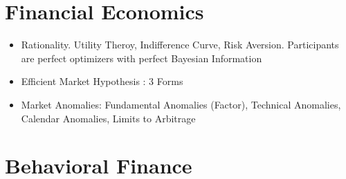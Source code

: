 \documentclass[11pt, openany]{book}              %
\begin{document}
\section{Financial Economics}
\begin{itemize}
    \item Rationality. Utility Theroy, Indifference Curve, Risk Aversion. Participants are perfect optimizers with perfect Bayesian Information
    \item Efficient Market Hypothesis : 3 Forms
    \item Market Anomalies: Fundamental Anomalies (Factor), Technical Anomalies, Calendar Anomalies, Limits to Arbitrage 
\end{itemize}

\section{Behavioral Finance}
\end{document}
